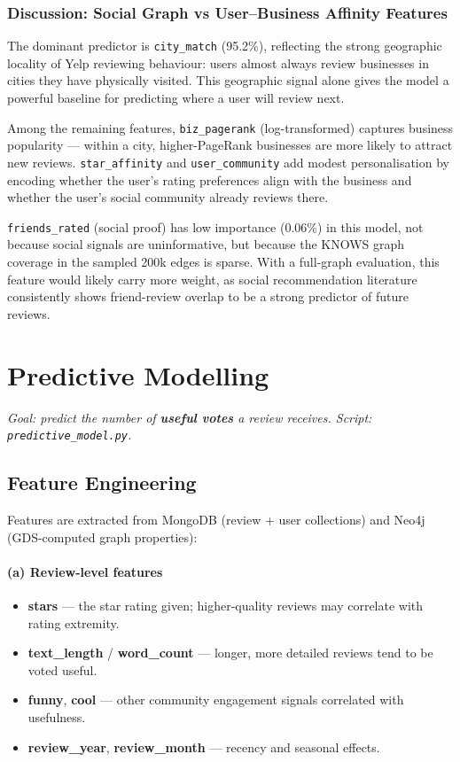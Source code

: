\documentclass[11pt,a4paper]{article}
\begin{document}
\subsubsection*{Discussion: Social Graph vs User--Business Affinity Features}

The dominant predictor is \texttt{city\_match} (95.2\%), reflecting the strong
geographic locality of Yelp reviewing behaviour: users almost always review
businesses in cities they have physically visited.  This geographic signal alone
gives the model a powerful baseline for predicting where a user will review next.

Among the remaining features, \texttt{biz\_pagerank} (log-transformed) captures
business popularity --- within a city, higher-PageRank businesses are more likely
to attract new reviews.  \texttt{star\_affinity} and \texttt{user\_community}
add modest personalisation by encoding whether the user's rating preferences
align with the business and whether the user's social community already reviews
there.

\texttt{friends\_rated} (social proof) has low importance (0.06\%) in this model,
not because social signals are uninformative, but because the KNOWS graph
coverage in the sampled 200k edges is sparse.  With a full-graph evaluation,
this feature would likely carry more weight, as social recommendation
literature consistently shows friend-review overlap to be a strong predictor of
future reviews.

\newpage
\section{Predictive Modelling}

\textit{Goal: predict the number of \textbf{useful votes} a review receives.
Script: \texttt{predictive\_model.py}.}

\subsection{Feature Engineering}

Features are extracted from MongoDB (review + user collections) and Neo4j
(GDS-computed graph properties):

\paragraph{(a) Review-level features}
\begin{itemize}[noitemsep]
  \item \textbf{stars} — the star rating given; higher-quality reviews may correlate with rating extremity.
  \item \textbf{text\_length} / \textbf{word\_count} — longer, more detailed reviews tend to be voted useful.
  \item \textbf{funny}, \textbf{cool} — other community engagement signals correlated with usefulness.
  \item \textbf{review\_year}, \textbf{review\_month} — recency and seasonal effects.
\end{itemize}
\end{document}
